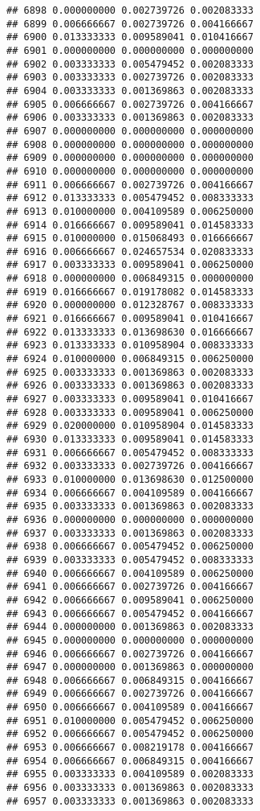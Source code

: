\documentclass[
]{article}
\begin{document}
\begin{verbatim}
## 6898 0.000000000 0.002739726 0.002083333
## 6899 0.006666667 0.002739726 0.004166667
## 6900 0.013333333 0.009589041 0.010416667
## 6901 0.000000000 0.000000000 0.000000000
## 6902 0.003333333 0.005479452 0.002083333
## 6903 0.003333333 0.002739726 0.002083333
## 6904 0.003333333 0.001369863 0.002083333
## 6905 0.006666667 0.002739726 0.004166667
## 6906 0.003333333 0.001369863 0.002083333
## 6907 0.000000000 0.000000000 0.000000000
## 6908 0.000000000 0.000000000 0.000000000
## 6909 0.000000000 0.000000000 0.000000000
## 6910 0.000000000 0.000000000 0.000000000
## 6911 0.006666667 0.002739726 0.004166667
## 6912 0.013333333 0.005479452 0.008333333
## 6913 0.010000000 0.004109589 0.006250000
## 6914 0.016666667 0.009589041 0.014583333
## 6915 0.010000000 0.015068493 0.016666667
## 6916 0.006666667 0.024657534 0.020833333
## 6917 0.003333333 0.009589041 0.006250000
## 6918 0.000000000 0.006849315 0.000000000
## 6919 0.016666667 0.019178082 0.014583333
## 6920 0.000000000 0.012328767 0.008333333
## 6921 0.016666667 0.009589041 0.010416667
## 6922 0.013333333 0.013698630 0.016666667
## 6923 0.013333333 0.010958904 0.008333333
## 6924 0.010000000 0.006849315 0.006250000
## 6925 0.003333333 0.001369863 0.002083333
## 6926 0.003333333 0.001369863 0.002083333
## 6927 0.003333333 0.009589041 0.010416667
## 6928 0.003333333 0.009589041 0.006250000
## 6929 0.020000000 0.010958904 0.014583333
## 6930 0.013333333 0.009589041 0.014583333
## 6931 0.006666667 0.005479452 0.008333333
## 6932 0.003333333 0.002739726 0.004166667
## 6933 0.010000000 0.013698630 0.012500000
## 6934 0.006666667 0.004109589 0.004166667
## 6935 0.003333333 0.001369863 0.002083333
## 6936 0.000000000 0.000000000 0.000000000
## 6937 0.003333333 0.001369863 0.002083333
## 6938 0.006666667 0.005479452 0.006250000
## 6939 0.003333333 0.005479452 0.008333333
## 6940 0.006666667 0.004109589 0.006250000
## 6941 0.006666667 0.002739726 0.004166667
## 6942 0.006666667 0.009589041 0.006250000
## 6943 0.006666667 0.005479452 0.004166667
## 6944 0.000000000 0.001369863 0.002083333
## 6945 0.000000000 0.000000000 0.000000000
## 6946 0.006666667 0.002739726 0.004166667
## 6947 0.000000000 0.001369863 0.000000000
## 6948 0.006666667 0.006849315 0.004166667
## 6949 0.006666667 0.002739726 0.004166667
## 6950 0.006666667 0.004109589 0.004166667
## 6951 0.010000000 0.005479452 0.006250000
## 6952 0.006666667 0.005479452 0.006250000
## 6953 0.006666667 0.008219178 0.004166667
## 6954 0.006666667 0.006849315 0.004166667
## 6955 0.003333333 0.004109589 0.002083333
## 6956 0.003333333 0.001369863 0.002083333
## 6957 0.003333333 0.001369863 0.002083333

\end{verbatim}
\end{document}
